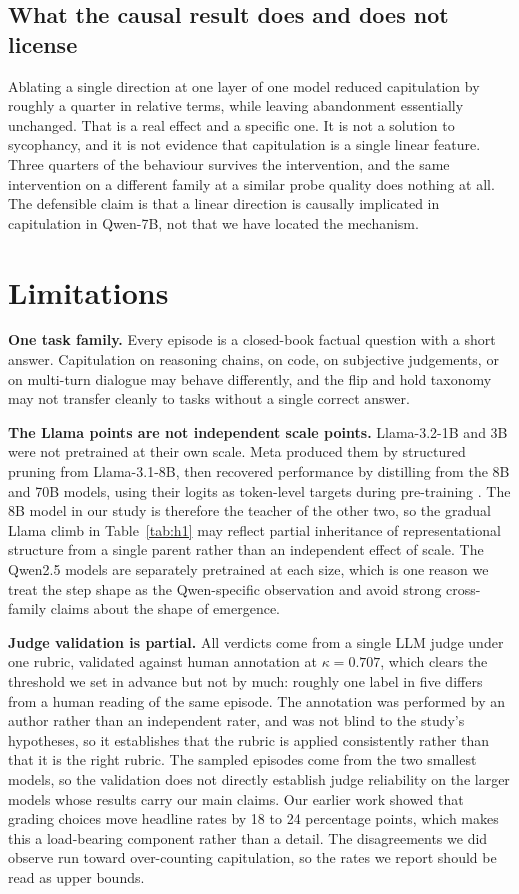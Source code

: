 \subsection{What the causal result does and does not license}

Ablating a single direction at one layer of one model reduced capitulation by roughly a
quarter in relative terms, while leaving abandonment essentially unchanged. That is a real
effect and a specific one. It is not a solution to sycophancy, and it is not evidence that
capitulation is a single linear feature. Three quarters of the behaviour survives the
intervention, and the same intervention on a different family at a similar probe quality
does nothing at all. The defensible claim is that a linear direction is causally implicated
in capitulation in Qwen-7B, not that we have located the mechanism.

\section{Limitations}
\label{sec:limitations}

\textbf{One task family.} Every episode is a closed-book factual question with a short
answer. Capitulation on reasoning chains, on code, on subjective judgements, or on
multi-turn dialogue may behave differently, and the flip and hold taxonomy may not transfer
cleanly to tasks without a single correct answer.

\textbf{The Llama points are not independent scale points.} Llama-3.2-1B and 3B were not
pretrained at their own scale. Meta produced them by structured pruning from Llama-3.1-8B,
then recovered performance by distilling from the 8B and 70B models, using their logits as
token-level targets during pre-training \citep{meta2024llama32}. The 8B model in our study
is therefore the teacher of the other two, so the gradual Llama climb in
Table~\ref{tab:h1} may reflect partial inheritance of representational structure from a
single parent rather than an independent effect of scale. The Qwen2.5 models are separately
pretrained at each size, which is one reason we treat the step shape as the Qwen-specific
observation and avoid strong cross-family claims about the shape of emergence.

\textbf{Judge validation is partial.} All verdicts come from a single LLM judge under one
rubric, validated against human annotation at $\kappa = 0.707$, which clears the threshold
we set in advance but not by much: roughly one label in five differs from a human reading of
the same episode. The annotation was performed by an author rather than an independent
rater, and was not blind to the study's hypotheses, so it establishes that the rubric is
applied consistently rather than that it is the right rubric. The sampled episodes come from the two smallest models, so the validation does not directly establish judge reliability on the larger models whose results carry our main claims. Our earlier work showed that
grading choices move headline rates by 18 to 24 percentage points, which makes this a
load-bearing component rather than a detail. The disagreements we did observe run toward
over-counting capitulation, so the rates we report should be read as upper bounds.

